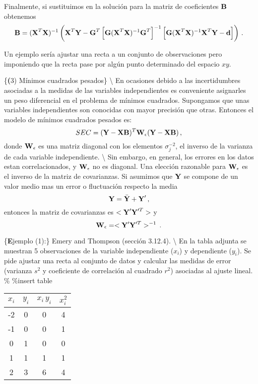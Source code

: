 \documentclass[
]{agujournal2019}
\begin{document}
\noindent Finalmente, si sustituimos en la solución para la matriz de
coeficientes \({\textbf B}\) obtenemos
\[{\textbf B}=({\textbf X}^T {\textbf X})^{-1}\left( {\textbf X}^T {\textbf Y} - {\textbf G}^T\left[{\textbf G}({\textbf X}^T{\textbf X})^{-1}{\textbf G}^T \right]^{-1}
           \left[{\textbf G}({\textbf X}^T{\textbf X})^{-1}{\textbf X}^T {\textbf Y}-{\textbf d}\right] \right)\,.\]

\noindent Un ejemplo sería ajustar una recta a un conjunto de
observaciones pero imponiendo que la recta pase por algún punto
determinado del espacio \(xy\).

\vspace{0.5cm}

\{\noindent \textbf (3) Mínimos cuadrados pesados\} \textbackslash{}
\noindent En ocasiones debido a las incertidumbres asociadas a la
medidas de las variables independientes es conveniente asignarles un
peso diferencial en el problema de mínimos cuadrados. Supongamos que
unas variables independientes son conocidas con mayor precisión que
otras. Entonces el modelo de mínimos cuadrados pesados es:
\[SEC=({\textbf Y}-{\textbf X}{\textbf B})^T{\textbf W}_{\epsilon}({\textbf Y}-{\textbf X}{\textbf B})\,,\]
donde \({\textbf W}_{\epsilon}\) es una matriz diagonal con los
elementos \(\sigma_j^{-2}\), el inverso de la varianza de cada variable
independiente. \textbackslash{} \noindent Sin embargo, en general, los
errores en los datos estan correlacionados, y \({\textbf W}_{\epsilon}\)
no es diagonal. Una elección razonable para \({\textbf W}_{\epsilon}\)
es el inverso de la matriz de covarianzas. Si asumimos que
\({\textbf Y}\) se compone de un valor medio mas un error o fluctuación
respecto la media \[{\textbf Y}=\bar{\textbf Y}+{\textbf Y}'\,,\]
entonces la matriz de covarianzas es \(<{\textbf Y}'{\textbf Y}'^T>\) y
\[{\textbf W}_{\epsilon}=<{\textbf Y}'{\textbf Y}'^T>^{-1}\,.\]

\vspace{0.5cm}

\{\noindent \textbf Ejemplo (1):\} Emery and Thompson (sección 3.12.4).
\textbackslash{} \noindent En la tabla adjunta se muestran 5
observaciones de la variable independiente (\(x_i\)) y dependiente
(\(y_i\)). Se pide ajustar una recta al conjunto de datos y calcular las
medidas de error (varianza \(s^2\) y coeficiente de correlación al
cuadrado \(r^2\)) asociadas al ajuste lineal. \% \%insert table

\begin{center}
\begin{tabular}{c c c c}
\hline\hline
$x_i$ & $y_i$ & $x_i\,y_i$ & $x_i^2$ \\ [0.5ex] %
\hline
-2 & 0 & 0 & 4 \\
-1 & 0 & 0 & 1 \\
0 & 1 & 0 & 0 \\
1 & 1 & 1  & 1 \\
2 & 3 & 6 & 4 \\ [1ex] %
\hline
\end{tabular}
\end{center}
\end{document}
